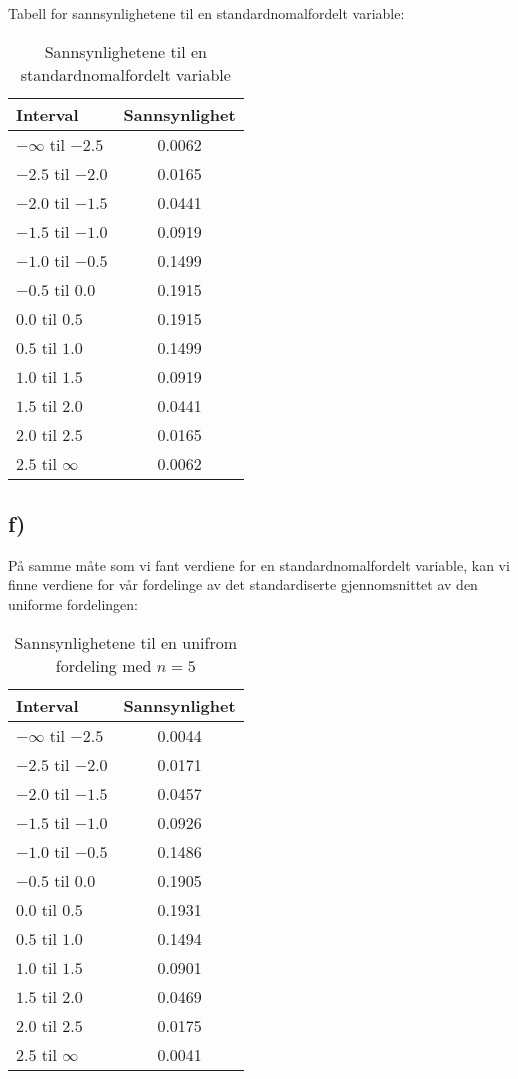 \documentclass[a4paper,norsk, 10pt]{article}
\begin{document}
Tabell for sannsynlighetene til en standardnomalfordelt variable:\\

\begin{table}[H]
\centering
\begin{tabular}{|l|c|}
\hline
Interval & Sannsynlighet\\
\hline
$- \infty$ til $-2.5$ & 0.0062\\
$- 2.5$ til $-2.0$ & 0.0165\\
$- 2.0$ til $-1.5$ & 0.0441\\
$- 1.5$ til $-1.0$ & 0.0919\\
$- 1.0$ til $-0.5$ & 0.1499\\
$- 0.5$ til $0.0$ & 0.1915\\

$ 0.0$ til $0.5$ & 0.1915\\
$ 0.5$ til $1.0$ & 0.1499\\
$ 1.0$ til $1.5$ & 0.0919\\
$ 1.5$ til $2.0$ & 0.0441\\
$ 2.0$ til $2.5$ & 0.0165\\
$ 2.5$ til $\infty$ & 0.0062\\ \hline
\end{tabular}
\caption{Sannsynlighetene til en standardnomalfordelt variable}
\label{tab:stand}
\end{table}


\subsection*{f)}

På samme måte som vi fant verdiene for en standardnomalfordelt variable, kan vi finne verdiene for vår fordelinge av det standardiserte gjennomsnittet av den uniforme fordelingen:

\begin{table}[H]
\centering
\begin{tabular}{|l|c|}
\hline
Interval & Sannsynlighet\\
\hline
$- \infty$ til $-2.5$ & 0.0044\\
$- 2.5$ til $-2.0$ & 0.0171\\
$- 2.0$ til $-1.5$ & 0.0457\\
$- 1.5$ til $-1.0$ & 0.0926\\
$- 1.0$ til $-0.5$ & 0.1486\\
$- 0.5$ til $0.0$ & 0.1905\\

$ 0.0$ til $0.5$ & 0.1931\\
$ 0.5$ til $1.0$ & 0.1494\\
$ 1.0$ til $1.5$ & 0.0901\\
$ 1.5$ til $2.0$ & 0.0469\\
$ 2.0$ til $2.5$ & 0.0175\\
$ 2.5$ til $\infty$ & 0.0041\\ \hline
\end{tabular}
\caption{Sannsynlighetene til en unifrom fordeling med $n = 5$}
\label{tab:uniform5}
\end{table}
\end{document}
